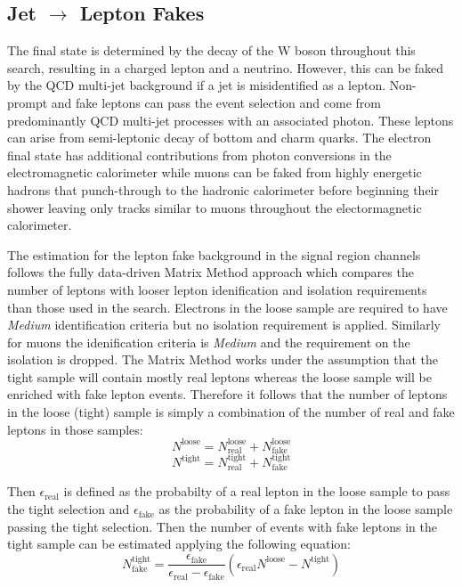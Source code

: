 \subsection{Jet $\rightarrow$ Lepton Fakes}
\label{sec:FakeLep}
The final state is determined by the decay of the W boson throughout this search, resulting in a charged lepton and a neutrino.  However, this can be faked by the QCD multi-jet background if a jet is misidentified as a lepton.  Non-prompt and fake leptons can pass the event selection and come from predominantly QCD multi-jet processes with an associated photon.  These leptons can arise from semi-leptonic decay of bottom and charm quarks.  The electron final state has additional contributions from photon conversions in the electromagnetic calorimeter while muons can be faked from highly energetic hadrons that punch-through to the hadronic calorimeter before beginning their shower leaving only tracks similar to muons throughout the electormagnetic calorimeter.  

The estimation for the lepton fake background in the signal region channels follows the fully data-driven Matrix Method\cite{MatrixMethod} approach which compares the number of leptons with looser lepton idenification and isolation requirements than those used in the search.  Electrons in the loose sample are required to have \textit{Medium} identification criteria but no isolation requirement is applied.  Similarly for muons the idenification criteria is \textit{Medium} and the requirement on the isolation is dropped.  The Matrix Method works under the assumption that the tight sample will contain mostly real leptons whereas the loose sample will be enriched with fake lepton events.  Therefore it follows that the number of leptons in the loose (tight) sample is simply a combination of the number of real and fake leptons in those samples:
\[
N^{\text{loose}} = N^{\text{loose}}_\text{real} +N^{\text{loose}}_\text{fake} \]
\[
N^{\text{tight}} = N^{\text{tight}}_\text{real} +N^{\text{tight}}_\text{fake} \]

Then $\epsilon_\text{real}$ is defined as the probabilty of a real lepton in the loose sample to pass the tight selection and $\epsilon_\text{fake}$ as the probability of a fake lepton in the loose sample passing the tight selection.  Then the number of events with fake leptons in the tight sample can be estimated applying the following equation:
\[  N_\text{fake}^\text{tight} = \frac{\epsilon_\text{fake}}{\epsilon_\text{real}-\epsilon_\text{fake}}(\epsilon_\text{real} N^\text{loose} -N^\text{tight})
\]

